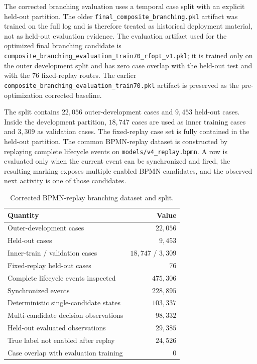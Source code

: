 \label{ssub:branching-eval}
The corrected branching evaluation uses a temporal case split with an explicit
held-out partition. The older \texttt{final\_composite\_branching.pkl} artifact
was trained on the full log and is therefore treated as historical deployment
material, not as held-out evaluation evidence. The evaluation artifact used for
the optimized final branching candidate is
\texttt{composite\_branching\_evaluation\_train70\_rfopt\_v1.pkl}; it is trained
only on the outer development split and has zero case overlap with the held-out
test and with the 76 fixed-replay routes. The earlier
\texttt{composite\_branching\_evaluation\_train70.pkl} artifact is preserved as
the pre-optimization corrected baseline.

The split contains $22{,}056$ outer-development cases and $9{,}453$ held-out
cases. Inside the development partition, $18{,}747$ cases are used as inner
training cases and $3{,}309$ as validation cases. The fixed-replay case set is
fully contained in the held-out partition. The common BPMN-replay dataset is
constructed by replaying complete lifecycle events on
\texttt{models/v4\_replay.bpmn}. A row is evaluated only when the current event
can be synchronized and fired, the resulting marking exposes multiple enabled
BPMN candidates, and the observed next activity is one of those candidates.

\begin{table}[H]
    \caption{Corrected BPMN-replay branching dataset and split.}
    \centering
    \renewcommand{\arraystretch}{1.15}
    \scriptsize
    \begin{tabular}{lr}
        \toprule
        \textbf{Quantity} & \textbf{Value} \\
        \midrule
        Outer-development cases & $22{,}056$ \\
        Held-out cases & $9{,}453$ \\
        Inner-train / validation cases & $18{,}747$ / $3{,}309$ \\
        Fixed-replay held-out cases & $76$ \\
        Complete lifecycle events inspected & $475{,}306$ \\
        Synchronized events & $228{,}895$ \\
        Deterministic single-candidate states & $103{,}337$ \\
        Multi-candidate decision observations & $98{,}332$ \\
        Held-out evaluated observations & $29{,}385$ \\
        True label not enabled after replay & $24{,}526$ \\
        Case overlap with evaluation training & $0$ \\
        \bottomrule
    \end{tabular}
    \label{tab:branching_corrected_dataset_joao}
\end{table}

